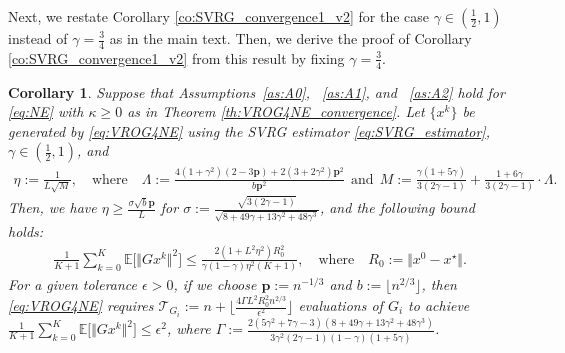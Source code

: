 \documentclass{article}
\newcommand{\sets}[1]{\{#1\}}
\newcommand{\norms}[1]{\Vert#1\Vert}
\newcommand{\Expk}[1]{\mathbb{E}\big[#1\big]}
\newcommand{\Tc}{\mathcal{T}}
\newcommand{\mbf}[1]{\mathbf{#1}}
\theoremstyle{plain}
\newtheorem{corollary}[theorem]{Corollary}
\theoremstyle{definition}
\theoremstyle{remark}
\begin{document}
Next, we restate Corollary \ref{co:SVRG_convergence1_v2} for the case $\gamma \in \left(\frac{1}{2}, 1\right)$ instead of $\gamma = \frac{3}{4}$ as in the main text.
Then, we derive the proof of Corollary \ref{co:SVRG_convergence1_v2} from this result by fixing $\gamma = \frac{3}{4}$.

\begin{corollary}\label{co:SVRG_convergence1_v2_full}
Suppose that Assumptions~\ref{as:A0}, ~\ref{as:A1}, and ~\ref{as:A2} hold for \eqref{eq:NE} with $\kappa \geq 0$ as in Theorem \ref{th:VROG4NE_convergence}.
Let $\sets{x^k}$ be generated by \eqref{eq:VROG4NE} using the SVRG estimator \eqref{eq:SVRG_estimator}, $\gamma \in \left(\frac{1}{2}, 1\right)$, and  
\begin{equation}\label{eq:SFP_para_choice_v2_full}
\begin{array}{l}
\eta := \frac{1}{L\sqrt{M}},  \quad \text{where} \quad \Lambda :=  \frac{4(1+\gamma^2)(2 - 3\mbf{p}) + 2(3+2\gamma^2)\mbf{p}^2}{b\mbf{p}^2} \ \ \text{and} \ \  M := \frac{\gamma(1+5\gamma)}{3(2\gamma-1)} + \frac{1 + 6\gamma}{3(2\gamma -1) } \cdot \Lambda.
\end{array}
\end{equation}
Then, we have $\eta \geq \frac{\sigma \sqrt{b}\mbf{p}}{L}$ for $\sigma := \frac{\sqrt{3(2\gamma-1)}}{\sqrt{8 + 49\gamma + 13\gamma^2 + 48\gamma^3}}$, and the following bound holds:
\begin{equation}\label{eq:SFP_convergence_bound_v2_full}
\begin{array}{ll}
\frac{1}{K+1}\sum_{k=0}^{K} \Expk{ \norms{Gx^k}^2 }   \leq     \frac{2(1 + L^2\eta^2) R_0^2 }{ \gamma(1-\gamma) \eta^2 (K + 1)},  \quad\text{where} \quad R_0 :=  \norms{x^0 - x^{\star}}.
\end{array}
\end{equation}
For a given tolerance $\epsilon > 0$, if we choose $\mbf{p} :=  n^{-1/3}$ and $b := \lfloor n^{2/3} \rfloor$, then \eqref{eq:VROG4NE} requires $\Tc_{G_i} := n + \big\lfloor\frac{4\Gamma  L^2R_0^2 n^{2/3} }{\epsilon^2} \big\rfloor$ evaluations of $G_i$ to achieve $\frac{1}{K+1}\sum_{k=0}^{K} \Expk{ \norms{Gx^k }^2 } \leq \epsilon^2$, where $\Gamma := \frac{2(5\gamma^2+7\gamma-3)(8 + 49\gamma + 13\gamma^2 + 48\gamma^3)}{3\gamma^2(2\gamma-1)(1-\gamma)(1+5\gamma)}$.
\end{corollary}
\end{document}
